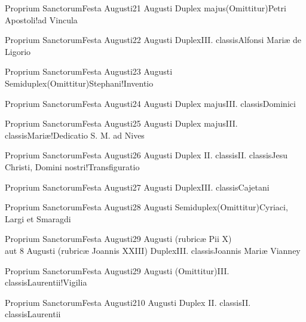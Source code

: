 \documentclass[invitatoriale-romanum.tex]{subfiles}
\begin{document}
	{Proprium Sanctorum}{Festa Augusti}{2}{1 Augusti}
	{Duplex majus}{(Omittitur)}{Petri Apostoli!ad Vincula}
	{}
	{\invitferia}

	{Proprium Sanctorum}{Festa Augusti}{2}{2 Augusti}
	{Duplex}{III. classis}{Alfonsi Mariæ de Ligorio}
	{}
	{}

	{Proprium Sanctorum}{Festa Augusti}{2}{3 Augusti}
	{Semiduplex}{(Omittitur)}{Stephani!Inventio}
	{}
	{\invitferia}

	{Proprium Sanctorum}{Festa Augusti}{2}{4 Augusti}
	{Duplex majus}{III. classis}{Dominici}
	{}
	{}

	{Proprium Sanctorum}{Festa Augusti}{2}{5 Augusti}
	{Duplex majus}{III. classis}{Mariæ!Dedicatio S. M. ad Nives}
	{}
	{}

	{Proprium Sanctorum}{Festa Augusti}{2}{6 Augusti}
	{Duplex II. classis}{II. classis}{Jesu Christi, Domini nostri!Transfiguratio}
	{}
	{}

	{Proprium Sanctorum}{Festa Augusti}{2}{7 Augusti}
	{Duplex}{III. classis}{Cajetani}
	{}
	{}

	{Proprium Sanctorum}{Festa Augusti}{2}{8 Augusti}
	{Semiduplex}{(Omittitur)}{Cyriaci, Largi et Smaragdi}
	{}
	{}

	{Proprium Sanctorum}{Festa Augusti}{2}{9 Augusti (rubricæ Pii X)\\aut 8 Augusti (rubricæ Joannis XXIII)}
	{Duplex}{III. classis}{Joannis Mariæ Vianney}
	{}
	{}

	{Proprium Sanctorum}{Festa Augusti}{2}{9 Augusti}
	{(Omittitur)}{III. classis}{Laurentii!Vigilia}
	{}
	{\invitferia}

\newpage
{}
	{Proprium Sanctorum}{Festa Augusti}{2}{10 Augusti}
	{Duplex II. classis}{II. classis}{Laurentii}
	{}
	{}
\end{document}
